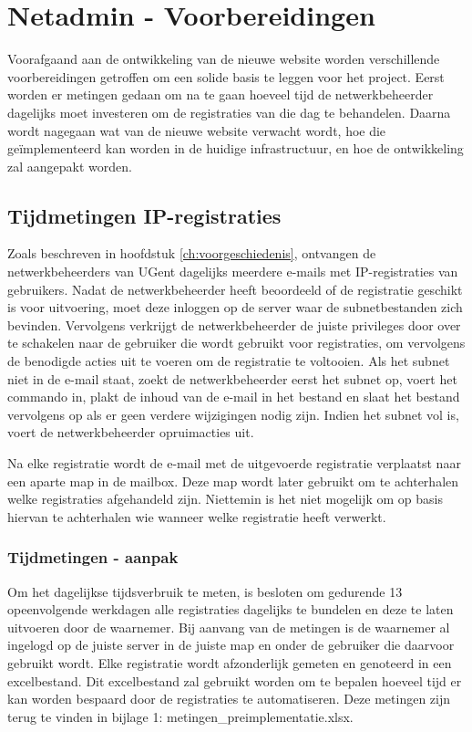 
\chapter{Netadmin - Voorbereidingen}%
\label{ch:netadmin-voorbereidingen}
Voorafgaand aan de ontwikkeling van de nieuwe website worden verschillende voorbereidingen getroffen om een solide basis te leggen voor het project. Eerst worden er metingen gedaan om na te gaan hoeveel tijd de netwerkbeheerder dagelijks moet investeren om de registraties van die dag te behandelen. Daarna wordt nagegaan wat van de nieuwe website verwacht wordt, hoe die geïmplementeerd kan worden in de huidige infrastructuur, en hoe de ontwikkeling zal aangepakt worden.

\section{Tijdmetingen IP-registraties}
Zoals beschreven in hoofdstuk \ref{ch:voorgeschiedenis}, ontvangen de netwerkbeheerders van UGent dagelijks meerdere e-mails met IP-registraties van gebruikers. Nadat de netwerkbeheerder heeft beoordeeld of de registratie geschikt is voor uitvoering, moet deze inloggen op de server waar de subnetbestanden zich bevinden. Vervolgens verkrijgt de netwerkbeheerder de juiste privileges door over te schakelen naar de gebruiker die wordt gebruikt voor registraties, om vervolgens de benodigde acties uit te voeren om de registratie te voltooien. Als het subnet niet in de e-mail staat, zoekt de netwerkbeheerder eerst het subnet op, voert het commando in, plakt de inhoud van de e-mail in het bestand en slaat het bestand vervolgens op als er geen verdere wijzigingen nodig zijn. Indien het subnet vol is, voert de netwerkbeheerder opruimacties uit.

Na elke registratie wordt de e-mail met de uitgevoerde registratie verplaatst naar een aparte map in de mailbox. Deze map wordt later gebruikt om te achterhalen welke registraties afgehandeld zijn. Niettemin is het niet mogelijk om op basis hiervan te achterhalen wie wanneer welke registratie heeft verwerkt.

\subsection{Tijdmetingen - aanpak}
Om het dagelijkse tijdsverbruik te meten, is besloten om gedurende 13 opeenvolgende werkdagen alle registraties dagelijks te bundelen en deze te laten uitvoeren door de waarnemer. Bij aanvang van de metingen is de waarnemer al ingelogd op de juiste server in de juiste map en onder de gebruiker die daarvoor gebruikt wordt. Elke registratie wordt afzonderlijk gemeten en genoteerd in een excelbestand. Dit excelbestand zal gebruikt worden om te bepalen hoeveel tijd er kan worden bespaard door de registraties te automatiseren. Deze metingen zijn terug te vinden in bijlage 1: metingen\_preimplementatie.xlsx.

